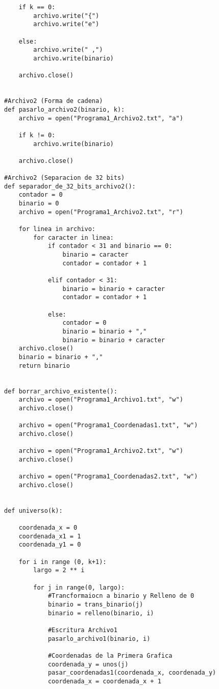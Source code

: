 \documentclass{article}
\begin{document}
\begin{flushleft}
\begin{lstlisting}
    if k == 0:
        archivo.write("{")
        archivo.write("e")
        
    else:
        archivo.write(" ,")
        archivo.write(binario)
        
    archivo.close()
        

#Archivo2 (Forma de cadena)
def pasarlo_archivo2(binario, k):
    archivo = open("Programa1_Archivo2.txt", "a")
    
    if k != 0:
        archivo.write(binario)    
    
    archivo.close()

#Archivo2 (Separacion de 32 bits)
def separador_de_32_bits_archivo2():
    contador = 0
    binario = 0
    archivo = open("Programa1_Archivo2.txt", "r")
    
    for linea in archivo:
        for caracter in linea:
            if contador < 31 and binario == 0:
                binario = caracter
                contador = contador + 1
                
            elif contador < 31:
                binario = binario + caracter
                contador = contador + 1
            
            else:
                contador = 0
                binario = binario + ","
                binario = binario + caracter
    archivo.close()
    binario = binario + ","
    return binario


def borrar_archivo_existente():
    archivo = open("Programa1_Archivo1.txt", "w")
    archivo.close()
    
    archivo = open("Programa1_Coordenadas1.txt", "w")
    archivo.close()
    
    archivo = open("Programa1_Archivo2.txt", "w")
    archivo.close()
    
    archivo = open("Programa1_Coordenadas2.txt", "w")
    archivo.close()
    

def universo(k):
    
    coordenada_x = 0
    coordenada_x1 = 1
    coordenada_y1 = 0
    
    for i in range (0, k+1):
        largo = 2 ** i
        
        for j in range(0, largo):
            #Trancformaiocn a binario y Relleno de 0
            binario = trans_binario(j)
            binario = relleno(binario, i)
            
            #Escritura Archivo1
            pasarlo_archivo1(binario, i)
            
            #Coordenadas de la Primera Grafica
            coordenada_y = unos(j)
            pasar_coordenadas1(coordenada_x, coordenada_y)
            coordenada_x = coordenada_x + 1
            

\end{lstlisting}
\end{flushleft}
\end{document}
